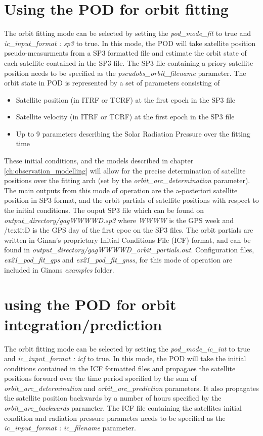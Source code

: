 \section{Using the POD for orbit fitting}
The orbit fitting mode can be selected by setting the \textit{ pod\_mode\_fit} to true and \textit{ic\_input\_format : sp3} to true. In this mode, the POD will take satellite position pseudo-measurments from a SP3 formatted file and estimate the orbit state of each satellite contained in the SP3 file. The SP3 file containing a priory satellite position needs to be specified as the \textit{pseudobs\_orbit\_filename} parameter.
The orbit state in POD is represented by a set of parameters consisting of 
\begin{itemize}
	\item Satellite position (in ITRF or TCRF) at the first epoch in the SP3 file
	\item Satellite velocity (in ITRF or TCRF) at the first epoch in the SP3 file
	\item Up to 9 parameters describing the Solar Radiation Pressure over the fitting time
\end{itemize}
These initial conditions, and the models described in chapter \ref{ch:observation_modelling} will allow for the precise determination of satellite positions over the fitting arch (set by the \textit{orbit\_arc\_determination} parameter).\\

The main outputs from this mode of operation are the a-posteriori satellite position in SP3 format, and the orbit partials of satellite positions with respect to the initial conditions. 
The ouput SP3 file which can be found on \textit{output\_directory/gagWWWWD.sp3} where \textit{WWWW} is the GPS week and /textit{D} is the GPS day of the first epoc on the SP3 files.
The orbit partials are written in Ginan's proprietary Initial Conditions File (ICF) format, and can be found in  \textit{output\_directory/gagWWWWD\_orbit\_partials.out}.
Configuration files, \textit{ex21\_pod\_fit\_gps} and \textit{ex21\_pod\_fit\_gnss},  for this mode of operation are included in Ginans \textit{examples} folder.\\

\section{using the POD for orbit integration/prediction}
The orbit fitting mode can be selected by setting the \textit{ pod\_mode\_ic\_int} to true and \textit{ic\_input\_format : icf} to true. 
 In this mode, the POD will take the initial conditions contained in the ICF formatted files and propagaes the satellite positions forward over the time period specified by the sum of \textit{orbit\_arc\_determination} and \textit{orbit\_arc\_prediction} parameters. 
 It also propagates the satellite position backwards by a number of hours specified by the \textit{orbit\_arc\_backwards} parameter.
 The ICF file containing the satellites initial condition and radiation pressure parametes needs to be specified as the \textit{ic\_input\_format : ic\_filename} parameter.\\

